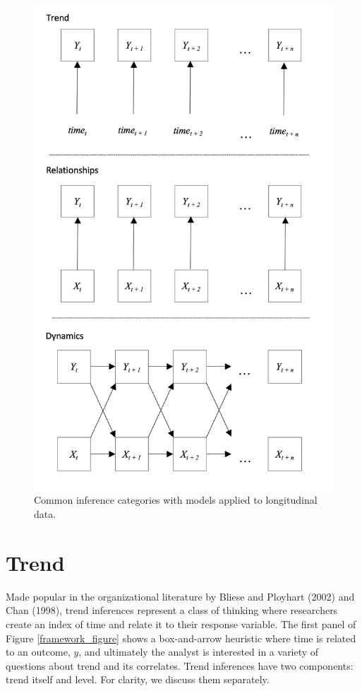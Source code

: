 \documentclass[english,,man]{apa6}
\theoremstyle{definition}
\theoremstyle{definition}
\theoremstyle{definition}
\theoremstyle{remark}
\begin{document}
\begin{figure}

{\centering \includegraphics[width=4.66in]{figures/dynamics/framework} 

}

\caption{Common inference categories with models applied to longitudinal data.\label{framework_figure}}\label{fig:unnamed-chunk-6}
\end{figure}

\hypertarget{trend}{%
\section{Trend}\label{trend}}

Made popular in the organizational literature by Bliese and Ployhart
(2002) and Chan (1998), trend inferences represent a class of thinking
where researchers create an index of time and relate it to their
response variable. The first panel of Figure \ref{framework_figure}
shows a box-and-arrow heuristic where time is related to an outcome,
\(y\), and ultimately the analyst is interested in a variety of
questions about trend and its correlates. Trend inferences have two
components: trend itself and level. For clarity, we discuss them
separately.
\end{document}
